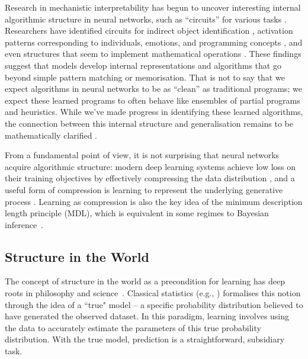 Research in mechanistic interpretability has begun to uncover interesting internal algorithmic structure in neural networks, such as ``circuits'' for various tasks \citep{olah2020zoom,cammarata2020thread,sharkey2025open}. Researchers have identified circuits for indirect object identification \citep{wang2022interpretability}, activation patterns corresponding to individuals, emotions, and programming concepts \citep{templeton2024scaling}, and even structures that seem to implement mathematical operations \citep{nanda2023progress}. These findings suggest that models develop internal representations and algorithms that go beyond simple pattern matching or memorisation. That is not to say that we expect algorithms in neural networks to be as ``clean'' as traditional programs; we expect these learned programs to often behave like ensembles of partial programs and heuristics. While we've made progress in identifying these learned algorithms, the connection between this internal structure and generalisation remains to be mathematically clarified \citep{olsson2022context,he2024learning}. %

From a fundamental point of view, it is not surprising that neural networks acquire algorithmic structure: modern deep learning systems achieve low loss on their training objectives by effectively compressing the data distribution \citep{shwartz2017opening,deletang2023language}, and a useful form of compression is learning to represent the underlying generative process \citep{schmidhuber1992learning,bengio2013representation,ha2018world}. Learning as compression is also the key idea of the minimum description length principle (MDL), which is equivalent in some regimes to Bayesian inference~\citep{grunwald2019minimum}.  %

\subsection{Structure in the World}

The concept of structure in the world as a precondition for learning has deep roots in philosophy and science~\citep{timaeus,bacon}. %
Classical statistics (e.g., \citealt{cox2006principles}) formalises this notion through the idea of a ``true" model -- a specific probability distribution believed to have generated the observed dataset. In this paradigm, learning involves using the data to accurately estimate the parameters of this true probability distribution. %
With the true model, prediction is a straightforward, subsidiary task.

